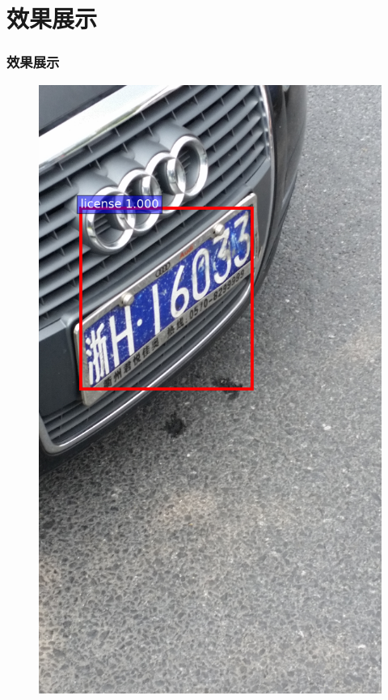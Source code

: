 \documentclass[UTF8]{beamer}
\begin{document}
\section{效果展示}

\begin{frame}
  \frametitle{效果展示}
  \begin{figure}[th]
    \centering
    {\includegraphics[height=0.6\textheight, keepaspectratio]{./Figure/DetectionDemo.png}}

\end{figure}
\end{frame}
\end{document}
